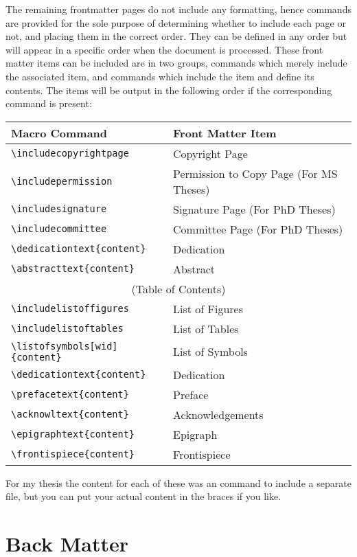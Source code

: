 \documentclass[11pt]{article}
\begin{document}
\begin{singlespace}
The remaining frontmatter pages do not include any formatting, hence commands
are provided for the sole purpose of determining whether to include each page or
not, and placing them in the correct order.   They can be defined in any order
but will appear in a specific order when the document is processed.  These front
matter items can be included are in two groups, commands which merely include
the associated item, and commands which include the item and define its
contents.  The items will be output in the following order if the corresponding
command is present:

\begin{tabular}{ll}
Macro Command & Front Matter Item \\ \hline
\verb+\includecopyrightpage+      & Copyright Page \\
\verb+\includepermission+         & Permission to Copy Page (For MS Theses) \\
\verb+\includesignature+          & Signature Page (For PhD Theses) \\
\verb+\includecommittee+          & Committee Page (For PhD Theses) \\
\verb+\dedicationtext{content}+   & Dedication \\
\verb+\abstracttext{content}+     & Abstract \\
\multicolumn{2}{c}{(Table of Contents)} \\
\verb+\includelistoffigures+      & List of Figures \\
\verb+\includelistoftables+       & List of Tables \\
\verb+\listofsymbols[wid]{content}+ & List of Symbols \\
\verb+\dedicationtext{content}+   & Dedication \\
\verb+\prefacetext{content}+      & Preface \\
\verb+\acknowltext{content}+      & Acknowledgements \\
\verb+\epigraphtext{content}+     & Epigraph \\
\verb+\frontispiece{content}+     & Frontispiece
\end{tabular}
\vspace{12pt}

For my thesis the content for each of these was an \verb++ command to
include a separate file, but you can put your actual content in the braces if
you like.

\section*{Back Matter}


\end{singlespace}
\end{document}
